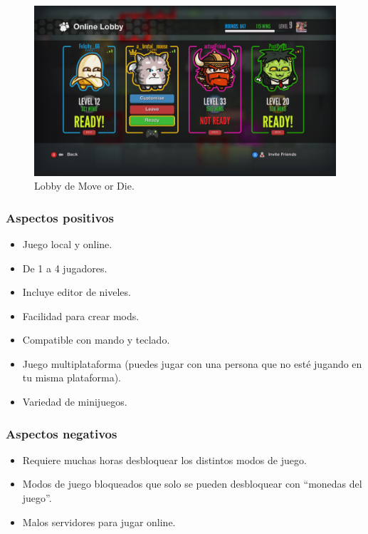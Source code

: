 \documentclass[12pt, spanish]{article}
\begin{document}
\begin{figure}[H]
  \centering
   \includegraphics[width=\textwidth]{"competencia/mod_lobby.jpg"}
	\caption{Lobby de Move or Die.}
\end{figure}

\subsubsection{Aspectos positivos}

\begin{itemize}
	\item Juego local y online.
	\item De 1 a 4 jugadores.
	\item Incluye editor de niveles.
	\item Facilidad para crear mods.
	\item Compatible con mando y teclado.
	\item Juego multiplataforma (puedes jugar con una persona que no esté jugando en tu misma plataforma).
	\item Variedad de minijuegos.
\end{itemize}

\subsubsection{Aspectos negativos}

\begin{itemize}
	\item Requiere muchas horas desbloquear los distintos modos de juego.
	\item Modos de juego bloqueados que solo se pueden desbloquear con “monedas del juego”.
	\item Malos servidores para jugar online.
\end{itemize}
\end{document}

